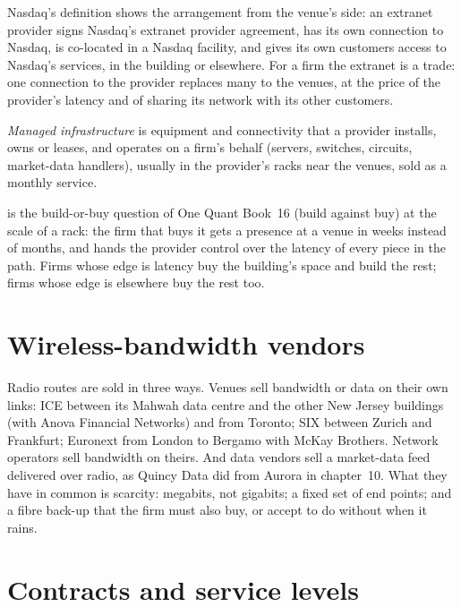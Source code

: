 Nasdaq's definition shows the arrangement from the venue's side: an extranet provider signs Nasdaq's extranet provider agreement, has its own
connection to Nasdaq, is co-located in a Nasdaq facility, and gives its own customers access to Nasdaq's services, in the building or elsewhere.
For a firm the extranet is a trade: one connection to the provider replaces many to the venues, at the price of the provider's latency and of
sharing its network with its other customers.

\begin{definition}\label{def:nw:buying-connectivity:managed}
\emph{Managed infrastructure} is equipment and connectivity that a provider installs, owns or leases, and operates
on a firm's behalf (servers, switches, circuits, market-data handlers), usually in the provider's racks near the venues, sold as a monthly
service.
\end{definition}

 is the build-or-buy question of One Quant Book~16 (build against buy) at the scale of a rack: the firm that buys it gets
a presence at a venue in weeks instead of months, and hands the provider control over the latency of every piece in the path. Firms whose
edge is latency buy the building's space and build the rest; firms whose edge is elsewhere buy the rest too.

\section{Wireless-bandwidth vendors}

Radio routes are sold in three ways. Venues sell bandwidth or data on their own links: ICE between its Mahwah data centre and the other New
Jersey buildings (with Anova Financial Networks) and from Toronto; SIX between Zurich and Frankfurt; Euronext from London to Bergamo with
McKay Brothers. Network operators sell bandwidth on theirs. And data vendors sell a market-data feed delivered over radio, as Quincy Data did
from Aurora in chapter~10. What they have in common is scarcity: megabits, not gigabits; a fixed set of end points; and a fibre back-up that
the firm must also buy, or accept to do without when it rains.

\section{Contracts and service levels}

